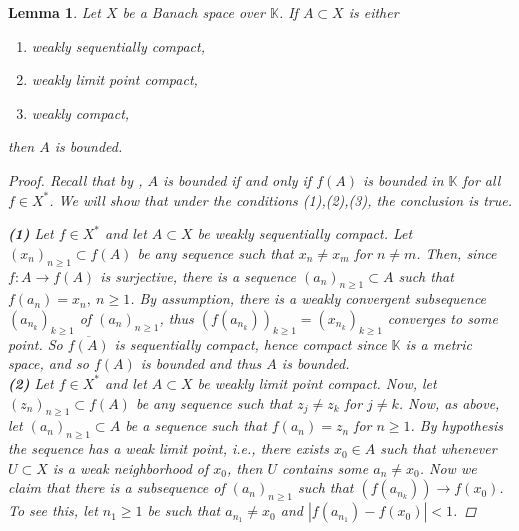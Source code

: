 \documentclass[10pt,twoside,openany,final]{memoir}
\theoremstyle{break}
\newtheorem{lemma}[section]{Lemma}
\theoremstyle{Break}
\begin{document}
\begin{lemma}\label{lemma:compactbounded}
Let $X$ be a Banach space over $\mathbb{K}$. If $A \subset X$ is either
\begin{enumerate}
\item weakly sequentially compact,
\item weakly limit point compact,
\item weakly compact,
\end{enumerate}
then $A$ is bounded.
\begin{proof}
Recall that by , $A$ is bounded if and only if $f(A)$ is bounded in $\mathbb{K}$ for all $f \in X^*$. We will show that under the conditions \textit{(1),(2),(3)}, the conclusion is true.

\noindent \textbf{(1)}
Let $f \in X^*$ and let $A \subset X$ be weakly sequentially compact. Let $(x_{n})_{n \geq 1}\subset f(A)$ be any sequence such that $x_{n} \neq x_{m}$ for  $n \neq m$. Then, since $f:A \to f(A)$ is surjective, there is a sequence $(a_{n})_{n \geq 1} \subset A$ such that $f(a_{n})=x_{n},\ n \geq 1$. By assumption, there is a weakly convergent subsequence $(a_{n_{k}})_{k \geq 1}$ of $(a_{n})_{n\geq 1}$, thus $(f(a_{n_{k}}))_{k \geq 1}=(x_{n_{k}})_{k \geq 1}$ converges to some point. So $\overline{f(A)}$ is sequentially compact, hence compact since $\mathbb{K}$ is a metric space, and so $f(A)$ is bounded and thus $A$ is bounded. \\ 


\textbf{(2)}
Let $f \in X^*$ and let $A \subset X$ be weakly limit point compact. Now, let $(z_{n})_{n \geq 1} \subset f(A)$ be any sequence such that $z_{j}\neq z_{k}$ for $j \neq k$. Now, as above, let $(a_{n})_{n \geq 1} \subset A$ be a sequence such that $f(a_{n})=z_{n}$ for $n \geq 1$. By hypothesis the sequence has a weak limit point, i.e., there exists $x_{0} \in A$ such that whenever $U \subset X$ is a weak neighborhood of $x_{0}$, then $U$ contains some $a_{n} \neq x_{0}$. Now we claim that there is a subsequence of $(a_{n})_{n \geq 1}$ such that $(f(a_{n_{k}})) \to f(x_{0}) $. To see this, let $n_{1} \geq 1$ be such that $a_{n_{1}} \neq x_{0}$ and $|f(a_{n_{1}})-f(x_{0})|<1$. 


\end{proof}
\end{lemma}
\end{document}
